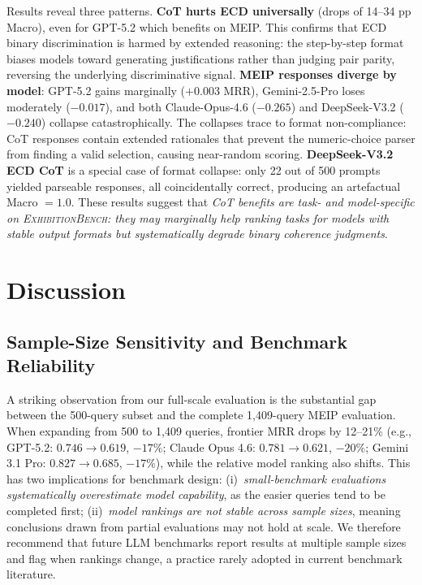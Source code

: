 \documentclass[11pt]{article}
\newcommand{\bench}{\textsc{ExhibitionBench}}
\begin{document}
Results reveal three patterns.
\textbf{CoT hurts ECD universally} (drops of 14--34 pp Macro),
even for GPT-5.2 which benefits on MEIP.
This confirms that ECD binary discrimination is harmed by extended
reasoning: the step-by-step format biases models toward generating
justifications rather than judging pair parity, reversing the underlying
discriminative signal.
\textbf{MEIP responses diverge by model}: GPT-5.2 gains marginally ($+0.003$ MRR),
Gemini-2.5-Pro loses moderately ($-0.017$), and both Claude-Opus-4.6 ($-0.265$)
and DeepSeek-V3.2 ($-0.240$) collapse catastrophically.
The collapses trace to format non-compliance: CoT responses contain
extended rationales that prevent the numeric-choice parser from finding
a valid selection, causing near-random scoring.
\textbf{DeepSeek-V3.2 ECD CoT} is a special case of format collapse:
only 22 out of 500 prompts yielded parseable responses, all coincidentally
correct, producing an artefactual Macro $= 1.0$.
These results suggest that \emph{CoT benefits are task- and model-specific
on \bench{}: they may marginally help ranking tasks for models with stable
output formats but systematically degrade binary coherence judgments}.

\section{Discussion}
\label{sec:discussion}

\subsection{Sample-Size Sensitivity and Benchmark Reliability}
\label{sec:samplesize}

A striking observation from our full-scale evaluation is the substantial
gap between the 500-query subset and the complete 1{,}409-query MEIP evaluation.
When expanding from 500 to 1{,}409 queries, frontier MRR drops by
12--21\% (e.g., GPT-5.2: $0.746 \to 0.619$, $-17\%$; Claude Opus 4.6:
$0.781 \to 0.621$, $-20\%$; Gemini 3.1 Pro: $0.827 \to 0.685$, $-17\%$),
while the relative model ranking also shifts.
This has two implications for benchmark design:
(i)~\emph{small-benchmark evaluations systematically overestimate model
capability}, as the easier queries tend to be completed first;
(ii)~\emph{model rankings are not stable across sample sizes},
meaning conclusions drawn from partial evaluations may not hold at scale.
We therefore recommend that future LLM benchmarks report results at
multiple sample sizes and flag when rankings change, a practice
rarely adopted in current benchmark literature.
\end{document}
